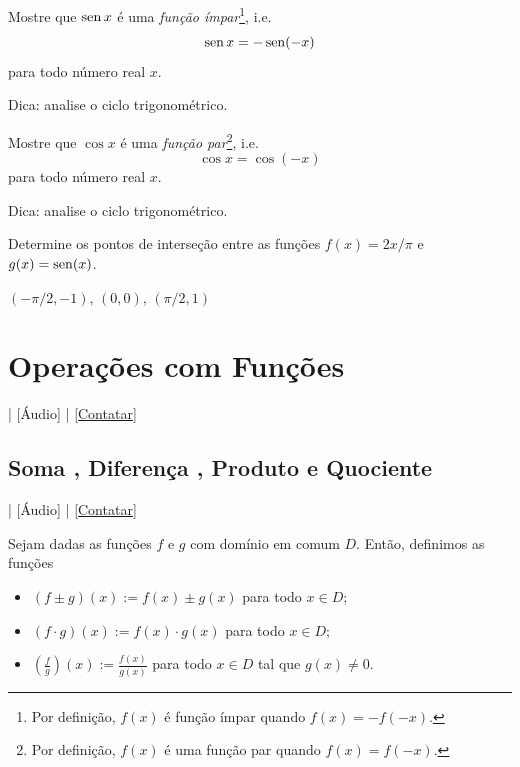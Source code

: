 \begin{exer}
  Mostre que $\operatorname{sen} x$ é  uma \emph{função ímpar}\footnote{Por definição, $f(x)$ é função ímpar quando $f(x)=-f(-x)$.}, i.e.
  \begin{equation}
    \operatorname{sen} x = -\operatorname{sen}(-x)
  \end{equation}
  para todo número real $x$.
\end{exer}
\begin{resp}
  Dica: analise o ciclo trigonométrico.
\end{resp}

\begin{exer}
  Mostre que $\cos x$ é  uma \emph{função par}\footnote{Por definição, $f(x)$ é uma função par quando $f(x)=f(-x)$.}, i.e.
  \begin{equation}
    \cos x = \cos(-x)
  \end{equation}
  para todo número real $x$.
\end{exer}
\begin{resp}
  Dica: analise o ciclo trigonométrico.
\end{resp}

\begin{exer}
  Determine os pontos de interseção entre as funções $f(x)=2x/\pi$ e $g(x)=\operatorname{sen}(x)$.
\end{exer}
\begin{resp}
  $(-\pi/2, -1)$, $(0,0)$, $(\pi/2, 1)$
\end{resp}

\section{Operações com Funções}\label{cap_funcao_sec_opfun}

\begin{flushright}
  [Vídeo] | [Áudio] | \href{https://phkonzen.github.io/notas/contato.html}{[Contatar]}
\end{flushright}

\subsection{Soma , Diferença , Produto  e Quociente }

\begin{flushright}
  [Vídeo] | [Áudio] | \href{https://phkonzen.github.io/notas/contato.html}{[Contatar]}
\end{flushright}

Sejam dadas as funções $f$ e $g$ com domínio em comum $D$. Então, definimos as funções
\begin{itemize}
\item $(f\pm g)(x) := f(x) \pm g(x)$ para todo $x\in D$;
\item $(f\cdot g)(x) := f(x)\cdot g(x)$ para todo $x\in D$;
\item $\displaystyle \left(\frac{f}{g}\right)(x) := \frac{f(x)}{g(x)}$ para todo $x\in D$ tal que $g(x)\neq 0$.
\end{itemize}

